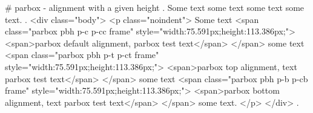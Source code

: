 #
parbox - alignment with a given height
.
\noindent
Some text
some text
some text
some text.
.
<div class="body">
<p class="noindent">
Some text <span class="parbox pbh p-c p-cc frame" style="width:75.591px;height:113.386px;">
<span>parbox default alignment, parbox test text</span>
</span> some text <span class="parbox pbh p-t p-ct frame" style="width:75.591px;height:113.386px;">
<span>parbox top alignment, text parbox test text</span>
</span> some text <span class="parbox pbh p-b p-cb frame" style="width:75.591px;height:113.386px;">
<span>parbox bottom alignment, text parbox test text</span>
</span> some text.
</p>
</div>
.

